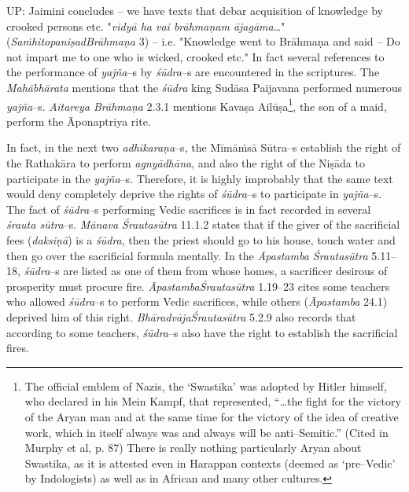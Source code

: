 UP: Jaimini concludes – we have texts that debar acquisition of knowledge by crooked persons etc. "\textit{vidyā ha vai brāhmaṇam ājagāma}…" (\textit{SaṁhitopaniṣadBrāhmaṇa} 3) – i.e. "Knowledge went to Brāhmaṇa and said – Do not impart me to one who is wicked, crooked etc." In fact several references to the performance of \textit{yajña}–s by \textit{śūdra}–s are encountered in the scriptures. The \textit{Mahābhārata} mentions that the \textit{śūdra} king Sudāsa Paijavana performed numerous \textit{yajña}–s. \textit{Aitareya Brāhmaṇa} 2.3.1 mentions Kavaṣa Ailūṣa\footnote{ The official emblem of Nazis, the ‘Swastika’ was adopted by Hitler himself, who declared in his Mein Kampf, that represented, “…the fight for the victory of the Aryan man and at the same time for the victory of the idea of creative work, which in itself always was and always will be anti–Semitic.” (Cited in Murphy et al, p. 87) There is really nothing particularly Aryan about Swastika, as it is attested even in Harappan contexts (deemed as ‘pre–Vedic’ by Indologists) as well as in African and many other cultures.}, the son of a maid, perform the Āponaptriya rite.

In fact, in the next two \textit{adhikaraṇa}–s, the Mīmāṁsā Sūtra–s establish the right of the Rathakāra to perform \textit{agnyādhāna}, and also the right of the Niṣāda to participate in the \textit{yajña}–s. Therefore, it is highly improbably that the same text would deny completely deprive the rights of \textit{śūdra}–s to participate in \textit{yajña}–s. The fact of \textit{śūdra}–s performing Vedic sacrifices is in fact recorded in several \textit{śrauta sūtra}–s. \textit{Mānava Śrautasūtra} 11.1.2 states that if the giver of the sacrificial fees (\textit{daksiṇā}) is a \textit{śūdra}, then the priest should go to his house, touch water and then go over the sacrificial formula mentally. In the \textit{Āpastamba Śrautasūtra} 5.11–18, \textit{śūdra}–s are listed as one of them from whose homes, a sacrificer desirous of prosperity must procure fire. \textit{ĀpastambaŚrautasūtra} 1.19–23 cites some teachers who allowed \textit{śūdra}–s to perform Vedic sacrifices, while others (\textit{Āpastamba} 24.1) deprived him of this right. \textit{BhāradvājaŚrautasūtra} 5.2.9 also records that according to some teachers, \textit{śūdra}–s also have the right to establish the sacrificial fires.

